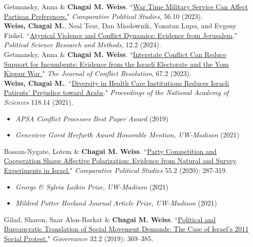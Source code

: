 \documentclass[11pt]{article}
\begin{document}
Getmansky, Anna \& \textbf{Chagai M. Weiss}. ``\href{https://journals.sagepub.com/doi/10.1177/00104140221141837}{War Time Military Service Can Affect Partisan Preferences.}" \emph{Comparative Political Studies}, 56.10 (2023).\\

\textbf{Weiss, Chagai M.}, Neal Tsur, Dan Miodownik, Yonatan Lupu, and Evgeny Finkel. ``\href{https://www.cambridge.org/core/journals/political-science-research-and-methods/article/atypical-violence-and-conflict-dynamics-evidence-from-jerusalem/689731DDDA2C0B9C818911C86B472460}{Atypical Violence and Conflict Dynamics: Evidence from Jerusalem}." \emph{Political Science Research and Methods}, 12.2 (2024).\\


Getmansky, Anna \& \textbf{Chagai M. Weiss}. ``\href{https://journals.sagepub.com/doi/10.1177/00220027221114086}{Interstate Conflict Can Reduce Support for Incumbents: Evidence from the Israeli Electorate and the Yom Kippur War
}"  \emph{The Journal of Conflict Resolution}, 67.2 (2023).\\


 \textbf{Weiss, Chagai M.}. ``\href{https://www.pnas.org/content/118/14/e2022634118}{Diversity in Health Care Institutions Reduces Israeli Patients' Prejudice toward Arabs}." \emph{Proceedings of the National Academy of Sciences} 118.14 (2021).
 \begin{itemize}[label=$\star$]
 \item \emph{APSA Conflict Processes Best Paper Award} (2019)
 \item \emph{Genevieve Gorst Herfurth Award Honorable Mention, UW-Madison} (2021)
\end{itemize}
Bassan-Nygate, Lotem \& \textbf{Chagai M. Weiss}. ``\href{https://journals.sagepub.com/doi/full/10.1177/00104140211024283}{Party Competition and Cooperation Shape Affective Polarization: Evidence from Natural and Survey Experiments in Israel.}" \emph{Comparative Political Studies} 55.2 (2020): 287-319.
    \begin{itemize}[label=$\star$]
 \item \emph{George \& Sylvia Laikin Prize, UW-Madison} (2021)
  \item \emph{Mildred Potter Hovland Journal Article Prize, UW-Madison} (2021)
 \end{itemize}
 
 Gilad, Sharon, Saar Alon-Barkat \& \textbf{Chagai M. Weiss}. ``\href{https://onlinelibrary.wiley.com/doi/abs/10.1111/gove.12383}{Political and Bureaucratic Translation of Social Movement Demands: The Case of Israel's 2011 Social Protest.}" \textit{Governance} 32.2 (2019): 369--385.\\
 
\end{document}

